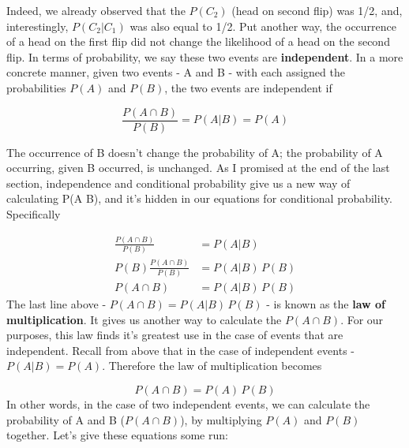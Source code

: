\documentclass[
]{book}
\theoremstyle{definition}
\theoremstyle{definition}
\theoremstyle{definition}
\theoremstyle{definition}
\theoremstyle{remark}
\begin{document}
Indeed, we already observed that the \(P(C_2)\) (head on second flip) was 1/2, and, interestingly, \(P(C_2|C_1)\) was also equal to 1/2. Put another way, the occurrence of a head on the first flip did not change the likelihood of a head on the second flip. In terms of probability, we say these two events are \textbf{independent}. In a more concrete manner, given two events - A and B - with each assigned the probabilities \(P(A)\) and \(P(B)\), the two events are independent if

\[
\frac{P(A \cap B)}{P(B)} = P(A|B) = P(A) 
\label{eq:conditional}
\]

The occurrence of B doesn't change the probability of A; the probability of A occurring, given B occurred, is unchanged. As I promised at the end of the last section, independence and conditional probability give us a new way of calculating P(A \cap B), and it's hidden in our equations for conditional probability. Specifically

\begin{align}
\frac{P(A \cap B)}{P(B)} &= P(A|B) \\
P(B)\frac{P(A \cap B)}{P(B)} &= P(A|B)\,P(B) \\
P(A \cap B) &= P(A|B)\,P(B)
\label{eq:lawofmultiplication}
\end{align}
The last line above - \(P(A \cap B) = P(A|B)\,P(B)\) - is known as the \textbf{law of multiplication}. It gives us another way to calculate the \(P(A \cap B)\). For our purposes, this law finds it's greatest use in the case of events that are independent. Recall from above that in the case of independent events - \(P(A|B) = P(A)\). Therefore the law of multiplication becomes

\[
P(A \cap B) = P(A)\,P(B)
\label{eq:lawofmultiplication2}
\]
In other words, in the case of two independent events, we can calculate the probability of A and B (\(P(A \cap B)\)), by multiplying \(P(A)\) and \(P(B)\) together. Let's give these equations some run:
\end{document}
